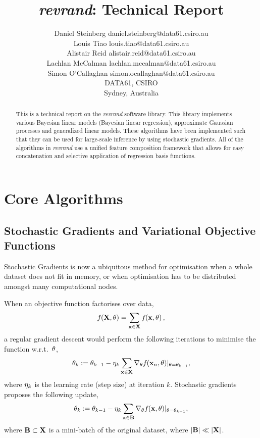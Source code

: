 \documentclass[11pt, oneside]{article}
\title{\emph{revrand}: Technical Report}
\author{\name Daniel Steinberg \email daniel.steinberg@data61.csiro.au \\
        \name Louis Tiao \email louis.tiao@data61.csiro.au \\
        \name Alistair Reid \email alistair.reid@data61.csiro.au \\
        \name Lachlan McCalman \email lachlan.mccalman@data61.csiro.au \\
        \name Simon O'Callaghan \email simon.ocallaghan@data61.csiro.au \\
        \addr DATA61, CSIRO \\
        Sydney, Australia}
\date{}
\begin{document}
\maketitle

\begin{abstract}
    This is a technical report on the \emph{revrand} software library. This
    library implements various Bayesian linear models (Bayesian linear
    regression), approximate Gaussian processes and generalized linear models.
    These algorithms have been implemented such that they can be used for
    large-scale inference by using stochastic gradients. All of the algorithms
    in \emph{revrand} use a unified feature composition framework that allows
    for easy concatenation and selective application of regression basis
    functions.
\end{abstract}

\tableofcontents

\section{Core Algorithms}

\subsection{Stochastic Gradients and Variational Objective Functions}
\label{sub:stochvar}

Stochastic Gradients is now a ubiquitous method for optimisation when a whole
dataset does not fit in memory, or when optimisation has to be distributed
amongst many computational nodes.

When an objective function factorises over data,
\begin{equation}
    {f}_{}\!\left({{\mathbf{X}, \theta}}\right) = \sum_{\mathbf{x} \in \mathbf{X}} {f}_{}\!\left({{\mathbf{x}, \theta}}\right),
\end{equation}
a regular gradient descent would perform the following iterations to minimise
the function w.r.t.\ $\theta$,
\begin{equation}
    \theta_k := \theta_{k-1} - \eta_k \sum_{\mathbf{x} \in \mathbf{X}}
    \nabla_{\theta} {f}_{}\!\left({{\mathbf{x}_n, \theta}}\right)\!|_{\theta = \theta_{k-1}},
\end{equation}
where $\eta_k$ is the learning rate (step size) at iteration $k$. Stochastic
gradients proposes the following update,
\begin{equation}
    \theta_k := \theta_{k-1} - \eta_k \sum_{\mathbf{x} \in \mathbf{B}}
    \nabla_{\theta} {f}_{}\!\left({{\mathbf{x}, \theta}}\right)\!|_{\theta = \theta_{k-1}},
    \label{eq:sg}
\end{equation}
where $\mathbf{B} \subset \mathbf{X}$ is a mini-batch of the original dataset, where
$|\mathbf{B}| \ll |\mathbf{X}|$.
\end{document}
